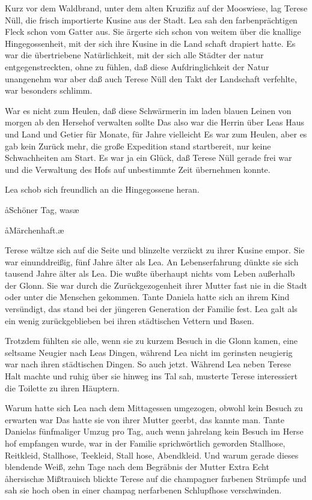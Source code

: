 Kurz vor dem Waldbrand, unter dem alten Kruzifiz auf der
Mooswiese, lag Terese Nüll, die frisch importierte Kusine
aus der Stadt. Lea sah den farbenprächtigen Fleck schon vom
Gatter aus. Sie ärgerte sich schon von weitem über die
knallige Hingegossenheit, mit der sich ihre Kusine in die Land\-%
schaft drapiert hatte. Es war die übertriebene Natürlichkeit,
mit der sich alle Städter der natur entgegenstreckten, ohne zu
fühlen, daß diese Aufdringlichkeit der Natur unangenehm
war\dopp{} aber daß auch Terese Nüll den Takt der Landschaft
verfehlte, war besonders schlimm.

War es nicht zum Heulen, daß diese Schwärmerin im laden\-%
blauen Leinen von morgen ab den Hersehof verwalten sollte\frag{}
Das also war die Herrin über Leas Haus und Land und
Getier für Monate, für Jahre vielleicht\frag{} Es war zum Heulen,
aber es gab kein Zurück mehr, die große Expedition stand
startbereit, nur keine Schwachheiten am Start. Es war ja
ein Glück, daß Terese Nüll gerade frei war und die Verwaltung
des Hofs auf unbestimmte Zeit übernehmen konnte.

Lea schob sich freundlich an die Hingegossene heran.

\aa{}Schöner Tag, was\frag{}\ae{}

\aa{}Märchenhaft.\ae{}

Terese wältze sich auf die Seite und blinzelte verzückt zu ihrer
Kusine empor. Sie war einunddreißig, fünf Jahre älter als
Lea. An Lebenserfahrung dünkte sie sich tausend Jahre älter
als Lea. Die wußte überhaupt nichts vom Leben außerhalb
der Glonn. Sie war durch die Zurückgezogenheit ihrer Mutter
fast nie in die Stadt oder unter die Menschen gekommen. Tante
Daniela hatte sich an ihrem Kind versündigt, das stand bei
der jüngeren Generation der Familie fest. Lea galt als ein
wenig zurückgeblieben bei ihren städtischen Vettern und Basen.

Trotzdem fühlten sie alle, wenn sie zu kurzem Besuch in die
Glonn kamen, eine seltsame Neugier nach Leas Dingen,
während Lea nicht im gerinsten neugierig war nach ihren
städtischen Dingen. So auch jetzt. Während Lea neben Terese
Halt machte und ruhig über sie hinweg ins Tal sah, musterte
Terese interessiert die Toilette zu ihren Häuptern.

Warum hatte sich Lea nach dem Mittagessen umgezogen,
obwohl kein Besuch zu erwarten war\frag{} Das hatte sie von ihrer
Mutter geerbt, das kannte man. Tante Danielas fünfmaliger
Umzug pro Tag, auch wenn jahrelang kein Besuch im Herse\-%
hof empfangen wurde, war in der Familie sprichwörtlich
geworden\dopp{} Stallhose, Reitkleid, Stallhose, Teekleid, Stall\-%
hose, Abendkleid. Und warum gerade dieses blendende Weiß,
zehn Tage nach dem Begräbnis der Mutter\frag{} Extra\frag{} Echt
\aa{}hersisch\ae{}\ausr{} Mißtrauisch blickte Terese auf die champagner\-%
farbenen Strümpfe und sah sie hoch oben in einer champag\-%
nerfarbenen Schlupfhose verschwinden.

